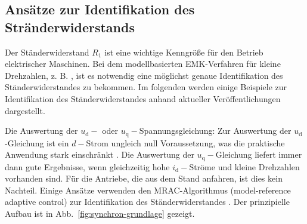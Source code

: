 \documentclass[conference,twocolumn]{IEEEtran}
\newcommand{\x}[1]{\mathrm{#1}}
\begin{document}


\subsection{Ansätze zur Identifikation des Stränderwiderstands}\label{sec:stator-ident}

Der Ständerwiderstand $R_\x{1}$ ist eine wichtige Kenngröße für den Betrieb elektrischer Maschinen.
Bei dem modellbasierten EMK-Verfahren für kleine Drehzahlen, z. B. \autocite{genduso}, ist es notwendig eine möglichst genaue Identifikation des Ständerwiderstandes zu bekommen.
Im folgenden werden einige Beispiele zur Identifikation des Ständerwiderstandes anhand aktueller Veröffentlichungen dargestellt.

Die Auswertung der $u_\x{d}-$ oder $u_\x{q}-$Spannungsgleichung: Zur Auswertung der $u_\x{d}$-Gleichung ist ein $d-$Strom ungleich null Voraussetzung, was die praktische Anwendung stark einschränkt \autocite{Kellner2012}.
Die Auswertung der $u_\x{q}-$Gleichung liefert immer dann gute Ergebnisse, wenn gleichzeitig hohe $i_\x{d}-$Ströme und kleine Drehzahlen vorhanden sind.
Für die Antriebe, die aus dem Stand anfahren, ist dies kein Nachteil.
Einige Ansätze verwenden den MRAC-Algorithmus (model-reference adaptive control) zur Identifikation des Ständerwiderstandes \autocite{slotine_applied_1991}.
Der prinzipielle Aufbau ist in Abb.~\ref{fig:synchron-grundlage} gezeigt.
\end{document}
